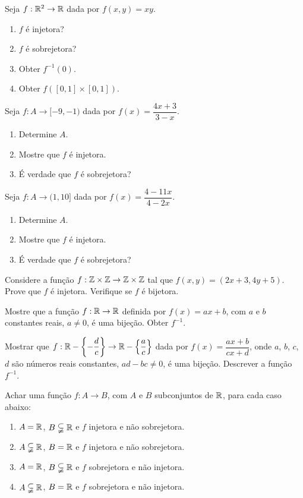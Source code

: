 \documentclass[12pt]{article}
\begin{document}
\questao Seja $f: \mathbb{R}^2 \to \mathbb{R}$ dada por $f(x,y) = xy$.
\begin{enumerate}[label={\alph*})]
	\item $f$ {\'e} injetora?
	\item $f$ {\'e} sobrejetora?
	\item Obter $f^{-1}({0})$.
	\item Obter $f([0,1]\times [0,1])$.
\end{enumerate}

\vesp

\questao Seja $f : A \to [-9,-1)$ dada por $f(x) = \dfrac{4x + 3}{3 - x}$.
\begin{enumerate}[label={\alph*})]
	\item Determine $A$.
	\item Mostre que $f$ é injetora.
	\item É verdade que $f$ é sobrejetora?
\end{enumerate}

\vesp

\questao Seja $f : A \to (1,10]$ dada por $f(x) = \dfrac{4 - 11x}{4 - 2x}$.
\begin{enumerate}[label={\alph*})]
	\item Determine $A$.
	\item Mostre que $f$ é injetora.
	\item É verdade que $f$ é sobrejetora?
\end{enumerate}

\vesp

\questao Considere a fun{\c c}{\~a}o $f : \mathbb{Z} \times \mathbb{Z} \to \mathbb{Z} \times \mathbb{Z}$ tal que $f(x,y) = (2x + 3, 4y + 5)$. Prove que $f$ {\'e} injetora. Verifique se $f$ {\'e} bijetora.

\vesp

\questao Mostre que a fun{\c c}{\~a}o $f : \mathbb{R} \to \mathbb{R}$ definida por $f(x) = ax + b$, com $a$ e $b$ constantes reais, $a \ne 0$, {\'e} uma bije{\c c}{\~a}o. Obter $f^{-1}$.

\vesp

\questao Mostrar que $f : \mathbb{R} - \left\{-\dfrac{d}{c}\right\} \to \mathbb{R}  - \left\{\dfrac{a}{c}\right\}$ dada por $f(x) =  \dfrac{ax + b}{cx + d}$, onde $a$, $b$, $c$, $d$ s{\~a}o n{\'u}meros reais constantes, $ad - bc \ne 0$, {\'e} uma bije{\c c}{\~a}o. Descrever a fun{\c c}{\~a}o $f^{-1}$.

\vesp

\questao Achar uma fun{\c c}{\~a}o $f : A \to B$, com $A$ e $B$ subconjuntos de $\mathbb{R}$, para cada caso abaixo:
\begin{enumerate}[label={\alph*})]
	\item $A = \mathbb{R}$, $B \subsetneqq \mathbb{R}$ e $f$ injetora e n{\~a}o sobrejetora.
	\item $A \subsetneqq \mathbb{R}$, $B = \mathbb{R}$ e $f$ injetora e n{\~a}o sobrejetora.
	\item $A = \mathbb{R}$, $B \subsetneqq \mathbb{R}$ e $f$ sobrejetora e n{\~a}o injetora.
	\item $A \subsetneqq \mathbb{R}$, $B = \mathbb{R}$ e $f$ sobrejetora e n{\~a}o injetora.
\end{enumerate}
\end{document}
